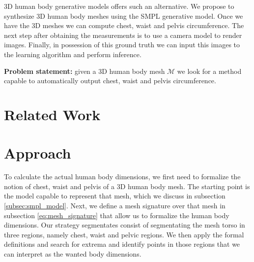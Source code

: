 \documentclass[runningheads]{llncs}
\begin{document}
3D human body generative models offers such an alternative. We propose to 
synthesize 3D human body meshes using the SMPL \cite{Loper.2015} generative 
model. Once we have 
the 3D meshes we can compute chest, waist and pelvis circumference. The next 
step after obtaining the 
measurements is to use a camera model to render
images. Finally, in possession of this ground truth we can 
input this images to the learning algorithm and perform inference.

\textbf{Problem statement:} given a 3D human body mesh $\mathcal{M}$ we look 
for a 
method capable to automatically output chest, waist and pelvis circumference.

\section{Related Work}\label{sec:rel_work}

\section{Approach}\label{sec:approach}
To calculate the actual human body dimensions, we first need to formalize the 
notion of chest, waist and pelvis of a 3D human body mesh. The starting point 
is the model capable to represent that mesh, which we discuss in subsection 
\ref{subsec:smpl_model}. Next, we define a mesh signature over that mesh in 
subsection \ref{eq:mesh_signature} that allow us to formalize the human body 
dimensions.
Our strategy segmentates consist of segmentating the mesh torso in three 
regions, namely chest, waist and pelvic regions. We then apply the formal 
definitions and search for extrema and identify points in those regions that we 
can interpret as the wanted body dimensions.  
\end{document}
